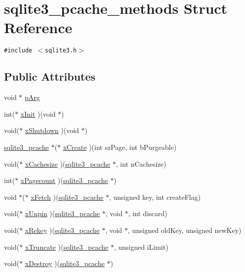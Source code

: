 \hypertarget{structsqlite3__pcache__methods}{
\section{sqlite3\_\-pcache\_\-methods Struct Reference}
\label{structsqlite3__pcache__methods}
}
{\tt \#include $<$sqlite3.h$>$}

\subsection*{Public Attributes}
\begin{CompactItemize}
\item 
void $\ast$ \hyperlink{structsqlite3__pcache__methods_c71a23fce5a94ac9bc6babdbbaf1b5b4}{pArg}
\item 
int($\ast$ \hyperlink{structsqlite3__pcache__methods_b5f54101f6060de1af0c87b2456231ad}{xInit} )(void $\ast$)
\item 
void($\ast$ \hyperlink{structsqlite3__pcache__methods_a88bb238d288631e7e06f4da232c3dbb}{xShutdown} )(void $\ast$)
\item 
\hyperlink{sqlite3_8h_096c453d937d51f7926d7d31c8e0bd2f}{sqlite3\_\-pcache} $\ast$($\ast$ \hyperlink{structsqlite3__pcache__methods_5c4d6839290d34cb3121f5210ddfb2ae}{xCreate} )(int szPage, int bPurgeable)
\item 
void($\ast$ \hyperlink{structsqlite3__pcache__methods_9cf385dbec7f0d19793e2616a73a3b7f}{xCachesize} )(\hyperlink{sqlite3_8h_096c453d937d51f7926d7d31c8e0bd2f}{sqlite3\_\-pcache} $\ast$, int nCachesize)
\item 
int($\ast$ \hyperlink{structsqlite3__pcache__methods_0ab192dc811798e8f17c445dbf379989}{xPagecount} )(\hyperlink{sqlite3_8h_096c453d937d51f7926d7d31c8e0bd2f}{sqlite3\_\-pcache} $\ast$)
\item 
void $\ast$($\ast$ \hyperlink{structsqlite3__pcache__methods_9e183d8bc9f625a08fa71734d2477dff}{xFetch} )(\hyperlink{sqlite3_8h_096c453d937d51f7926d7d31c8e0bd2f}{sqlite3\_\-pcache} $\ast$, unsigned key, int createFlag)
\item 
void($\ast$ \hyperlink{structsqlite3__pcache__methods_de2ab50cc6896be03ee86541877fa85e}{xUnpin} )(\hyperlink{sqlite3_8h_096c453d937d51f7926d7d31c8e0bd2f}{sqlite3\_\-pcache} $\ast$, void $\ast$, int discard)
\item 
void($\ast$ \hyperlink{structsqlite3__pcache__methods_dc5552190f1de86eb95d91e9cf8430e6}{xRekey} )(\hyperlink{sqlite3_8h_096c453d937d51f7926d7d31c8e0bd2f}{sqlite3\_\-pcache} $\ast$, void $\ast$, unsigned oldKey, unsigned newKey)
\item 
void($\ast$ \hyperlink{structsqlite3__pcache__methods_ad73f9335999770bcd2dc6a2d914b4f0}{xTruncate} )(\hyperlink{sqlite3_8h_096c453d937d51f7926d7d31c8e0bd2f}{sqlite3\_\-pcache} $\ast$, unsigned iLimit)
\item 
void($\ast$ \hyperlink{structsqlite3__pcache__methods_ac18fc581d8d63550a6657016c24ba5d}{xDestroy} )(\hyperlink{sqlite3_8h_096c453d937d51f7926d7d31c8e0bd2f}{sqlite3\_\-pcache} $\ast$)
\end{CompactItemize}


